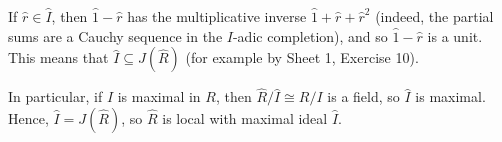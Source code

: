 If $\hat{r} \in \hat{I}$, then $\hat{1} - \hat{r}$ has the multiplicative
inverse $\hat{1} + \hat{r} + \hat{r}^2$ (indeed, the partial sums are a Cauchy
sequence in the  $I$-adic completion), and so $\hat{1} - \hat{r}$ is a unit.
This means that $\hat{I} \subseteq J(\hat{R})$ (for example by Sheet 1, Exercise 10).

In particular, if $I$ is maximal in $R$, then $\hat{R}/\hat{I}\cong R/I$ is a field,
so $\hat{I}$ is maximal. Hence, $\hat{I} = J(\hat{R})$, so $\hat{R}$ is local
with maximal ideal $\hat{I}$.
